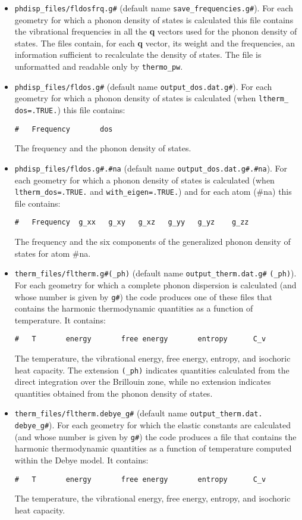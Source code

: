 \documentclass[12pt,a4paper,twoside]{report}
\begin{document}
\begin{itemize}
\item 
\texttt{phdisp\_files/fldosfrq.g\#} (default name 
\texttt{save\_frequencies.g\#}). For each geometry for which a phonon 
density of states is calculated this file contains the vibrational  
frequencies in all the {\bf q} vectors used for the phonon density of states.
The files contain, for each {\bf q} vector, its weight and the frequencies,
an information sufficient to recalculate the density of states.
The file is unformatted and readable only by \texttt{thermo\_pw}.

\item 
\texttt{phdisp\_files/fldos.g\#} (default name 
\texttt{output\_dos.dat.g\#}). For each geometry for which a phonon density of 
states is calculated (when \texttt{ltherm\_} \texttt{dos=.TRUE.}) this file contains:
\begin{verbatim}
#   Frequency       dos
\end{verbatim}
The frequency and the phonon density of states. 

\item 
\texttt{phdisp\_files/fldos.g\#.\#na} (default name 
\texttt{output\_dos.dat.g\#.\#na}). For each geometry for which a phonon 
density of states is calculated (when \texttt{ltherm\_dos=.TRUE.} and
\texttt{with\_eigen=.TRUE.}) and for each atom (\#na) this file contains: 
\begin{verbatim}
#   Frequency  g_xx   g_xy   g_xz   g_yy   g_yz    g_zz
\end{verbatim}
The frequency and the six components of the generalized phonon density of 
states for atom \#na. 

\item 
\texttt{therm\_files/fltherm.g\#(\_ph)} (default name 
\texttt{output\_therm.dat.g\#} \texttt{(\_ph)}). For each geometry for which 
a complete phonon dispersion is calculated (and whose number is given
by \texttt{g\#}) the code produces one of these files that contains 
the harmonic 
thermodynamic quantities as a function of temperature. It contains:
\begin{verbatim}
#   T       energy       free energy       entropy      C_v 
\end{verbatim}
The temperature, the vibrational energy, free energy, entropy, and
isochoric heat capacity. The extension \texttt{(\_ph)} indicates 
quantities calculated from the direct integration over the Brillouin zone,
while no extension indicates quantities obtained from the phonon density 
of states.

\item 
\texttt{therm\_files/fltherm.debye\_g\#} (default name 
\texttt{output\_therm.dat.}\\ \texttt{debye\_g\#}). For each geometry 
for which 
the elastic constants are calculated (and whose number is given
by \texttt{g\#}) the code produces a file that contains 
the harmonic thermodynamic quantities as a function of temperature computed
within the Debye model. It contains:
\begin{verbatim}
#   T       energy       free energy       entropy      C_v 
\end{verbatim}
The temperature, the vibrational energy, free energy, entropy, and
isochoric heat capacity.  


\end{itemize}
\end{document}
